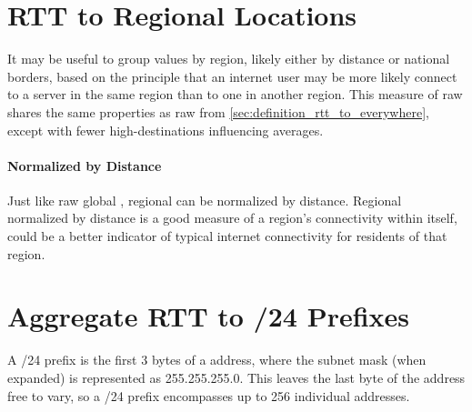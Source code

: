 % 

\section{RTT to Regional Locations}\label{sec:definition_rtt_regional}

It may be useful to group \rtt values by region, likely either by distance or national borders, based on the principle that an internet user may be more likely connect to a server in the same region than to one in another region. This measure of raw \rtt shares the same properties as raw \rtt from \cref{sec:definition_rtt_to_everywhere}, except with fewer high-\rtt destinations influencing averages.

\paragraph{Normalized by Distance}
Just like raw global \rtts, regional \rtts can be normalized by distance. Regional \rtt normalized by distance is a good measure of a region's connectivity within itself, could be a better indicator of typical internet connectivity for residents of that region.

\section{Aggregate RTT to /24 Prefixes}\label{sec:definition_rtt_24}

A /24 prefix is the first 3 bytes of a \ipvf address, where the subnet mask (when expanded) is represented as 255.255.255.0. This leaves the last byte of the address free to vary, so a /24 prefix encompasses up to 256 individual addresses.

